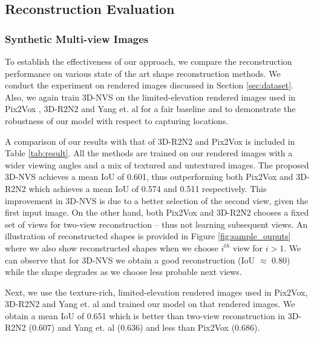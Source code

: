 \subsection{Reconstruction Evaluation}
\label{sec:synthetic-results}
\subsubsection{Synthetic Multi-view Images}
To establish the effectiveness of our approach, we compare the reconstruction performance on various state of the art shape reconstruction methods. We conduct the experiment on rendered images discussed in Section \ref{sec:dataset}. Also, we again train 3D-NVS on the limited-elevation rendered images used in Pix2Vox \cite{pix2vox}, 3D-R2N2 \cite{3dr2n2} and Yang et. al \cite{yang2018active} for a fair baseline and to demonstrate the robustness of our model with respect to capturing locations.

A comparison of our results with that of 3D-R2N2 and Pix2Vox is included in Table \ref{tab:result}. All the methods are trained on our rendered images with a wider viewing angles and a mix of textured and untextured images. The proposed 3D-NVS  achieves a mean IoU of 0.601, thus outperforming both Pix2Vox and 3D-R2N2 which achieves a mean IoU of 0.574 and 0.511 respectively. This improvement in 3D-NVS is due to a better selection of the second view, given the first input image. On the other hand, both Pix2Vox and 3D-R2N2 chooses a fixed set of views for two-view reconstruction -- thus not learning subsequent views. An illustration of reconstructed shapes is provided in Figure \ref{fig:sample_ouputs} where we also show reconstructed shapes when we choose $i^{th}$ view for $i>1$. We can observe that for 3D-NVS we obtain a good reconstruction (IoU $\approx$ 0.80) while the shape degrades as we choose less probable next views.

Next, we use the texture-rich, limited-elevation rendered images used in Pix2Vox, 3D-R2N2 and Yang et. al and trained our model on that rendered images. We obtain a mean IoU of 0.651 which is better than two-view reconstruction in 3D-R2N2 (0.607) and Yang et. al (0.636) and less than Pix2Vox (0.686).

